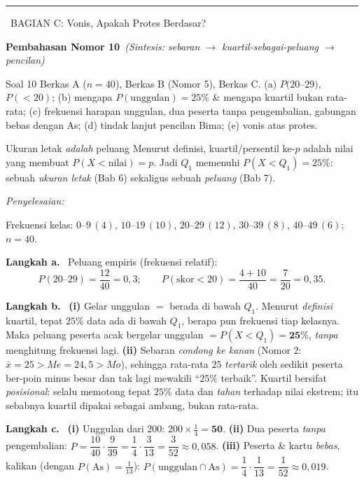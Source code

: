 \documentclass[11pt,a4paper]{article}
\newcommand{\jawab}{\par\smallskip\noindent\textit{\textcolor{oranye}{Penyelesaian:}}\par\smallskip}
\newcommand{\langkah}[1]{\par\smallskip\noindent\textbf{\textcolor{biru}{Langkah #1.}}\ }
\newcommand{\bagianjudul}[1]{\par\bigskip\noindent%
  {\large\bfseries\color{ungu}\rule[-2pt]{4pt}{16pt}\ #1}\par\smallskip}
\newcommand{\nomorjudul}[2]{\par\bigskip\noindent%
  {\large\bfseries\color{ungu}Pembahasan Nomor #1}\ {\normalfont\itshape\color{gray}(#2)}\par\nopagebreak\smallskip}
\begin{document}
\bagianjudul{BAGIAN C: Vonis, Apakah Protes Berdasar?}

\nomorjudul{10}{Sintesis: sebaran $\to$ kuartil-sebagai-peluang $\to$ pencilan}
\begin{soalbox}{Soal 10}
Berkas A ($n=40$), Berkas B (Nomor 5), Berkas C. (a) $P(20$--$29)$, $P(<20)$;
(b) mengapa $P(\text{unggulan})=25\%$ \& mengapa kuartil bukan rata-rata;
(c) frekuensi harapan unggulan, dua peserta tanpa pengembalian, gabungan bebas
dengan As; (d) tindak lanjut pencilan Bima; (e) vonis atas protes.
\end{soalbox}

\begin{ingat}{Ukuran letak \emph{adalah} peluang}
Menurut definisi, kuartil/persentil ke-$p$ adalah nilai yang membuat
$P(X<\text{nilai})=p$. Jadi $Q_1$ memenuhi $P(X<Q_1)=25\%$: sebuah \emph{ukuran
letak} (Bab 6) sekaligus sebuah \emph{peluang} (Bab 7).
\end{ingat}

\jawab
Frekuensi kelas: $0$--$9\,(4)$, $10$--$19\,(10)$, $20$--$29\,(12)$, $30$--$39\,(8)$,
$40$--$49\,(6)$; $n=40$.

\langkah{a} Peluang empiris (frekuensi relatif):
\[
P(20\text{--}29)=\frac{12}{40}=0{,}3;\qquad
P(\text{skor}<20)=\frac{4+10}{40}=\frac{7}{20}=0{,}35.
\]

\langkah{b} \textbf{(i)} Gelar unggulan $=$ berada di bawah $Q_1$. Menurut
\emph{definisi} kuartil, tepat $25\%$ data ada di bawah $Q_1$, berapa pun
frekuensi tiap kelasnya. Maka peluang peserta acak bergelar unggulan
$=P(X<Q_1)=\mathbf{25\%}$, \emph{tanpa} menghitung frekuensi lagi.
\textbf{(ii)} Sebaran \emph{condong ke kanan} (Nomor 2: $\bar{x}=25>Me=24{,}5>Mo$),
sehingga rata-rata $25$ \emph{tertarik} oleh sedikit peserta ber-poin minus besar
dan tak lagi mewakili ``$25\%$ terbaik''. Kuartil bersifat \emph{posisional}:
selalu memotong tepat $25\%$ data dan \emph{tahan} terhadap nilai ekstrem; itu
sebabnya kuartil dipakai sebagai ambang, bukan rata-rata.

\langkah{c} \textbf{(i)} Unggulan dari $200$: $200\times\tfrac14=\mathbf{50}$.
\textbf{(ii)} Dua peserta \emph{tanpa} pengembalian:
$P=\dfrac{10}{40}\cdot\dfrac{9}{39}=\dfrac14\cdot\dfrac{3}{13}=\dfrac{3}{52}\approx0{,}058$.
\textbf{(iii)} Peserta \& kartu \emph{bebas}, kalikan (dengan $P(\mathrm{As})=\tfrac1{13}$):
$P(\text{unggulan}\cap\mathrm{As})=\dfrac14\cdot\dfrac1{13}=\dfrac{1}{52}\approx0{,}019$.
\end{document}

